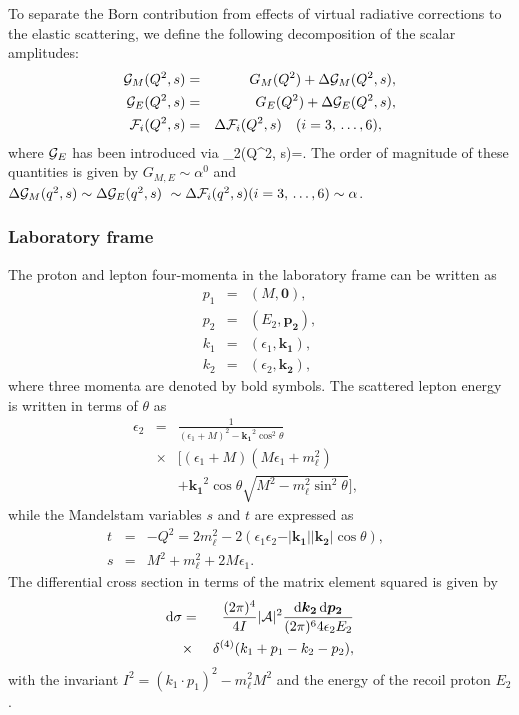 To separate the Born contribution from effects of virtual radiative corrections to the elastic scattering, we define the following
decomposition of the scalar amplitudes:
    \begin{eqnarray}
{\cal G}_M(Q^2, s)&=&G_M(Q^2)+\Delta{\cal G}_M(Q^2, s), \\
 {\cal G}_E(Q^2, s)&=&G_E(Q^2)+\Delta{\cal G}_E(Q^2, s),\\
 {\cal F}_i(Q^2, s)&=&\Delta{\cal F}_i(Q^2, s) \quad (i=3,\, \dots, 6),\quad
\label{eq:eq8}
\end{eqnarray}
where ${\cal G}_E$ has been introduced via
\beq
\cF_2(Q^2, s)=\left[\cG_M(Q^2, s)-\cG_{E}(Q^2, s)\right].
\eeq
The order of magnitude of these quantities is given by
$ G_{M,E}\sim\alpha^0$ and 
$\Delta{\cal G}_M(q^2,s)\sim\Delta{\cal G}_E(q^2, s)~
\sim\Delta{\cal F}_i(q^2, s) (i=3,\, \dots, 6)\sim\alpha  $.

\subsubsection{Laboratory frame}



The proton
and lepton four-momenta in the laboratory frame can be written as
\begin{eqnarray}\label{eq:eq2}
p_1&=&(M,\boldsymbol{0}),\\
p_2&=&(E_2, \boldsymbol{p_2}),\\
k_1&=&(\epsilon_1, \boldsymbol{k_1}),\\ k_2&=&(\epsilon_2, \boldsymbol{k_2}),
\end{eqnarray}
where three momenta are denoted by bold symbols. The scattered lepton
energy is written in terms of $\theta $ as
\begin{eqnarray}    
\epsilon_2&=& \frac{1}
{(\epsilon_1+M)^2-\boldsymbol{k_1}^{\!2}\cos^2\theta }\nonumber\\
&\times& \Bigg[(\epsilon_1+M)(M\epsilon_1 +
m_\ell^2)\nonumber\\
&&+\boldsymbol{k_1}^{\!2}\cos\theta\sqrt{ M^2-m_\ell^2\sin^2\theta}\Bigg],\qquad
\label{eq:eqe12}
\end{eqnarray}
while the Mandelstam variables $s$ and $t$ are expressed as
\begin{eqnarray}\label{eq:eqq2}
t&=&-Q^2=2m_\ell^2-2(\epsilon_1\epsilon_2-\vert\boldsymbol{k_1}\vert \vert\boldsymbol{k_2}\vert\cos\theta),\qquad\\
s&=& M^2 + m_\ell^2 + 2 M \epsilon_1.
\end{eqnarray}
The differential cross section in terms of the  matrix element squared is given by
\begin{eqnarray}
\mathrm{d}\sigma&=&\frac{(2\pi )^4}{4I}\vert{{\mathcal A}}\vert^2\frac{\mathrm{d}{\boldsymbol {k_2}}\,\mathrm{d}{\boldsymbol{
p_2}}}{(2\pi )^64\epsilon_2E_2}\nonumber\\
&\times&\,\delta^{(4)}(k_1+p_1-k_2-p_2),
\label{eq:eq10}
\end{eqnarray}
with the invariant $I^2=(k_1\cdot p_1)^2-m_\ell^2M^2$ and the
energy of the recoil proton $E_2$.

